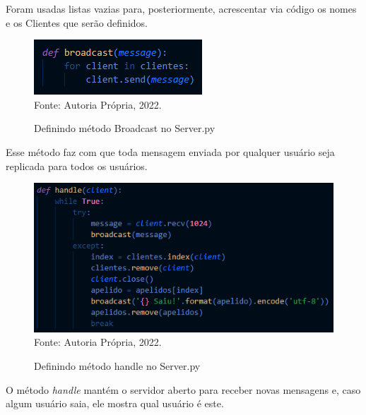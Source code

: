 \par Foram usadas listas vazias para, posteriormente, acrescentar via código os nomes e os Clientes que serão definidos.
\newline

\newpage\thispagestyle{empty}
\begin{figure}[htbp]
	\centering
	\caption{Definindo método Broadcast no Server.py}
	\includegraphics[]{PrintsServer/Broadcast.png}
	{\\Fonte: Autoria Própria, 2022.}
	\label{fig:criação_1}
\end{figure}

\par Esse método faz com que toda mensagem enviada por qualquer usuário seja replicada para todos os usuários.
\newline

\begin{figure}[htbp]
	\centering
	\caption{Definindo método handle no Server.py}
	\includegraphics[]{PrintsServer/handle.png}
	{\\Fonte: Autoria Própria, 2022.}
	\label{fig:criação_1}
\end{figure}


\par O método \textit{handle} mantém o servidor aberto para receber novas mensagens e, caso algum usuário saia, ele mostra qual usuário é este.
\newline

